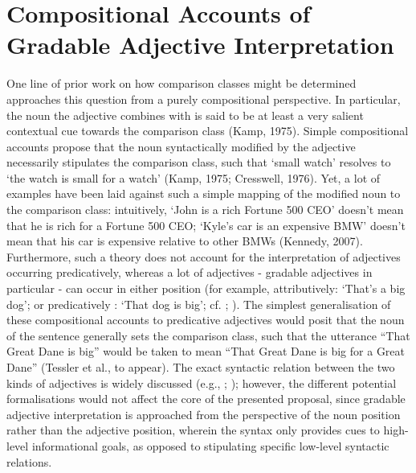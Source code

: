 \section{Compositional Accounts of Gradable Adjective Interpretation}
One line of prior work on how comparison classes might be determined approaches this question from a purely compositional perspective. In particular, the noun the adjective combines with is said to be at least a very salient contextual cue towards the comparison class (Kamp, 1975). 
Simple compositional accounts propose that the noun syntactically modified by the adjective necessarily stipulates the comparison class, such that ‘small watch’ resolves to ‘the watch is small for a watch’ (Kamp, 1975; Cresswell, 1976).
Yet, a lot of examples have been laid against such a simple mapping of the modified noun to the comparison class: intuitively, ‘John is a rich Fortune 500 CEO’ doesn’t mean that he is rich for a Fortune 500 CEO; ‘Kyle’s car is an expensive BMW’ doesn’t mean that his car is expensive relative to other BMWs (Kennedy, 2007). Furthermore, such a theory does not account for the interpretation of adjectives occurring predicatively, whereas a lot of adjectives - gradable adjectives in particular - can occur in either position (for example, attributively: ‘That’s a big dog’; or predicatively : ‘That dog is big’; cf. \cite{mcnally2008}; \cite{hofherr2010adjectives}).
The simplest generalisation of these compositional accounts to predicative adjectives would posit that the noun of the sentence generally sets the comparison class, such that the utterance “That Great Dane is big” would be taken to mean “That Great Dane is big for a Great Dane” (Tessler et al., to appear).
The exact syntactic relation between the two kinds of adjectives is widely discussed (e.g., \cite{Cresswell1976}; \cite{Kamp1975, hofherr2010adjectives}); however, the different potential formalisations would not affect the core of the presented proposal, since gradable adjective interpretation is approached from the perspective of the noun position rather than the adjective position, wherein the syntax only provides cues to high-level informational goals, as opposed to stipulating specific low-level syntactic relations.

